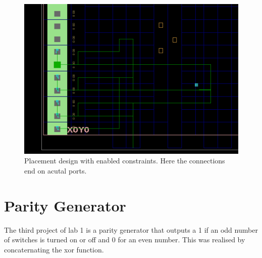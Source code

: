 \begin{figure}
	\centering
	\includegraphics[width=.8\linewidth]{./L1/E2/with_constrains}
	\caption{Placement design with enabled constraints. Here the connections end on acutal ports.}
	\label{fig: placement with constraints e_1_2_5}
\end{figure}



\section{Parity Generator}

The third project of lab 1 is a parity generator that outputs a 1 if an odd number of switches is turned on or off and 0 for an even number. This was realised by concaternating the xor function.


